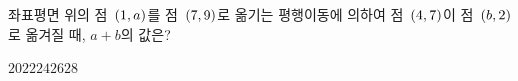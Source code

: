 좌표평면 위의 점~$(1{,}\mkern3mu a)$를 점~$(7{,}\mkern3mu 9)$로 옮기는 평행이동에 의하여 점~$(4{,}\mkern3mu 7)$이 점~$(b{,}\mkern3mu 2)$로 옮겨질 때, $a+b$의 값은?
\begin{choices32}{$20$}{$22$}{$24$}{$26$}{$28$}\end{choices32}
